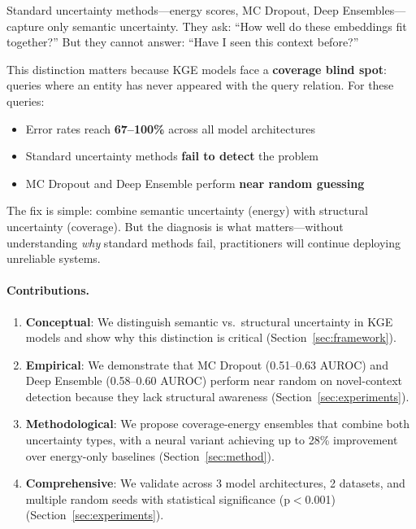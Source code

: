\documentclass{article}
\begin{document}
Standard uncertainty methods---energy scores, MC Dropout, Deep Ensembles---capture only semantic uncertainty.
They ask: ``How well do these embeddings fit together?''
But they cannot answer: ``Have I seen this context before?''

This distinction matters because KGE models face a \textbf{coverage blind spot}: queries where an entity has never appeared with the query relation.
For these queries:
\begin{itemize}
    \item Error rates reach \textbf{67--100\%} across all model architectures
    \item Standard uncertainty methods \textbf{fail to detect} the problem
    \item MC Dropout and Deep Ensemble perform \textbf{near random guessing}
\end{itemize}

The fix is simple: combine semantic uncertainty (energy) with structural uncertainty (coverage).
But the diagnosis is what matters---without understanding \emph{why} standard methods fail, practitioners will continue deploying unreliable systems.

\paragraph{Contributions.}
\begin{enumerate}
    \item \textbf{Conceptual}: We distinguish semantic vs.\ structural uncertainty in KGE models and show why this distinction is critical (Section~\ref{sec:framework}).

    \item \textbf{Empirical}: We demonstrate that MC Dropout (0.51--0.63 AUROC) and Deep Ensemble (0.58--0.60 AUROC) perform near random on novel-context detection because they lack structural awareness (Section~\ref{sec:experiments}).

    \item \textbf{Methodological}: We propose coverage-energy ensembles that combine both uncertainty types, with a neural variant achieving up to 28\% improvement over energy-only baselines (Section~\ref{sec:method}).

    \item \textbf{Comprehensive}: We validate across 3 model architectures, 2 datasets, and multiple random seeds with statistical significance (p$<$0.001) (Section~\ref{sec:experiments}).
\end{enumerate}
\end{document}
